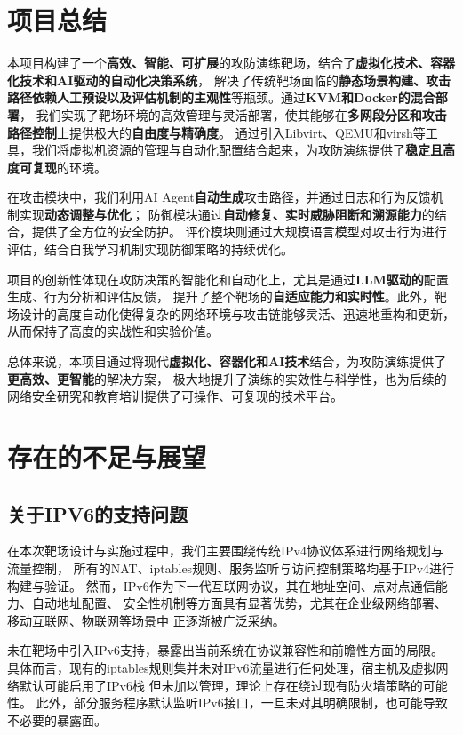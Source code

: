 \documentclass[lang=cn,10pt]{elegantbook}
\begin{document}
\section{项目总结}

本项目构建了一个\textbf{高效、智能、可扩展}的攻防演练靶场，结合了\textbf{虚拟化技术、容器化技术和AI驱动的自动化决策系统}，
解决了传统靶场面临的\textbf{静态场景构建、攻击路径依赖人工预设以及评估机制的主观性}等瓶颈。通过\textbf{KVM和Docker的混合部署}，
我们实现了靶场环境的高效管理与灵活部署，使其能够在\textbf{多网段分区和攻击路径控制}上提供极大的\textbf{自由度与精确度}。
通过引入Libvirt、QEMU和virsh等工具，我们将虚拟机资源的管理与自动化配置结合起来，为攻防演练提供了\textbf{稳定且高度可复现}的环境。

在攻击模块中，我们利用AI Agent\textbf{自动生成}攻击路径，并通过日志和行为反馈机制实现\textbf{动态调整与优化}；
防御模块通过\textbf{自动修复、实时威胁阻断和溯源能力}的结合，提供了全方位的安全防护。
评价模块则通过大规模语言模型对攻击行为进行评估，结合自我学习机制实现防御策略的持续优化。

项目的创新性体现在攻防决策的智能化和自动化上，尤其是通过\textbf{LLM驱动的}配置生成、行为分析和评估反馈，
提升了整个靶场的\textbf{自适应能力和实时性}。此外，靶场设计的高度自动化使得复杂的网络环境与攻击链能够灵活、迅速地重构和更新，
从而保持了高度的实战性和实验价值。

总体来说，本项目通过将现代\textbf{虚拟化、容器化和AI技术}结合，为攻防演练提供了\textbf{更高效、更智能}的解决方案，
极大地提升了演练的实效性与科学性，也为后续的网络安全研究和教育培训提供了可操作、可复现的技术平台。


\section{存在的不足与展望}

\subsection{关于IPV6的支持问题}

在本次靶场设计与实施过程中，我们主要围绕传统IPv4协议体系进行网络规划与流量控制，
所有的NAT、iptables规则、服务监听与访问控制策略均基于IPv4进行构建与验证。
然而，IPv6作为下一代互联网协议，其在地址空间、点对点通信能力、自动地址配置、
安全性机制等方面具有显著优势，尤其在企业级网络部署、移动互联网、物联网等场景中
正逐渐被广泛采纳。

未在靶场中引入IPv6支持，暴露出当前系统在协议兼容性和前瞻性方面的局限。
具体而言，现有的iptables规则集并未对IPv6流量进行任何处理，宿主机及虚拟网络默认可能启用了IPv6栈
但未加以管理，理论上存在绕过现有防火墙策略的可能性。
此外，部分服务程序默认监听IPv6接口，一旦未对其明确限制，也可能导致不必要的暴露面。
\end{document}
